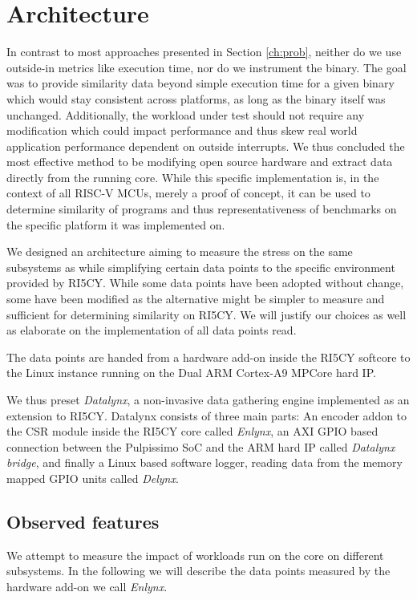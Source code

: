 \documentclass[../bachelor_paper.tex]{subfiles}
\begin{document}
\chapter{Architecture}
    \label{ch:arch}
In contrast to most approaches presented in Section \ref{ch:prob}, neither do we use outside-in metrics like execution time, nor do we instrument the binary. The goal was to provide similarity data beyond simple execution time for a given binary which would stay consistent across platforms, as long as the binary itself was unchanged. Additionally, the workload under test should not require any modification which could impact performance and thus skew real world application performance dependent on outside interrupts. We thus concluded the most effective method to be modifying open source hardware and extract data directly from the running core. While this specific implementation is, in the context of all RISC-V \acp{MCU}, merely a proof of concept, it can be used to determine similarity of programs and thus representativeness of benchmarks on the specific platform it was implemented on.

We designed an architecture aiming to measure the stress on the same subsystems as \cite{phansalkarMeasuringProgramSimilarity2005,joshiMeasuringBenchmarkSimilarity2006,eeckhoutQuantifyingImpactInput} while simplifying certain data points to the specific environment provided by RI5CY. While some data points have been adopted without change, some have been modified as the alternative might be simpler to measure and sufficient for determining similarity on RI5CY. We will justify our choices as well as elaborate on the implementation of all data points read.

The data points are handed from a hardware add-on inside the RI5CY softcore to the Linux instance running on the Dual ARM Cortex-A9 MPCore hard \ac{IP}.

We thus preset \emph{Datalynx}, a non-invasive data gathering engine implemented as an extension to RI5CY. Datalynx consists of three main parts: An encoder addon to the \ac{CSR} module inside the RI5CY core called \emph{Enlynx}, an AXI GPIO based connection between the Pulpissimo \ac{SoC} and the ARM hard \ac{IP} called \emph{Datalynx bridge}, and finally a Linux based software logger, reading data from the memory mapped GPIO units called \emph{Delynx}.

\section{Observed features}
We attempt to measure the impact of workloads run on the core on different subsystems. In the following we will describe the data points measured by the hardware add-on we call \emph{Enlynx}.
\end{document}
